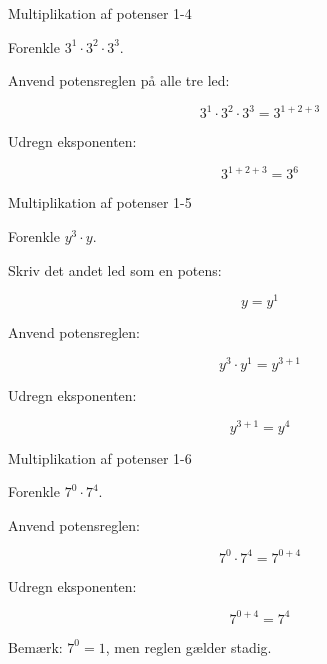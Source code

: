 \documentclass{article}
\begin{document}
\newpage

\begin{exercise}{Multiplikation af potenser 1-4}

Forenkle $3^1 \cdot 3^2 \cdot 3^3$.


\hint

Anvend potensreglen på alle tre led:

\hint
\[
3^1 \cdot 3^2 \cdot 3^3 = 3^{1+2+3}
\]

\hint

Udregn eksponenten:

\hint
\[
3^{1+2+3} = 3^6
\]

\end{exercise}

\newpage

\begin{exercise}{Multiplikation af potenser 1-5}

Forenkle $y^3 \cdot y$.


\hint

Skriv det andet led som en potens:

\hint
\[
y = y^1
\]

\hint

Anvend potensreglen:

\hint
\[
y^3 \cdot y^1 = y^{3+1}
\]

\hint

Udregn eksponenten:

\hint
\[
y^{3+1} = y^4
\]

\end{exercise}

\newpage

\begin{exercise}{Multiplikation af potenser 1-6}

Forenkle $7^0 \cdot 7^4$.


\hint

Anvend potensreglen:

\hint
\[
7^0 \cdot 7^4 = 7^{0+4}
\]

\hint

Udregn eksponenten:

\hint
\[
7^{0+4} = 7^4
\]

\hint

Bemærk: $7^0 = 1$, men reglen gælder stadig.

\end{exercise}
\end{document}
